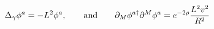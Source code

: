 \begin{equation}
    \label{hedgehog}
    \Delta_\gamma \phi^a=-L^2 \phi^a, \qquad\text{and}\qquad
    \partial_M \phi^{a\dagger} \partial^M \phi^a =
    e^{-2\rho} {L^2 v^2 \over R^2}
\end{equation}

